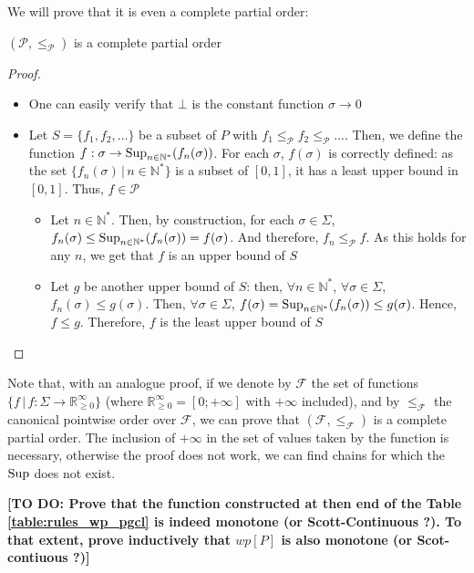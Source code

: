 \documentclass[a4paper,10pt]{llncs}
\def\NN {{\mathbb N}}
\def\RRposi {{\mathbb R_{\geq 0}^{\infty}}}
\def\Sup {\textnormal {Sup}}
\newcommand\todo[1]{{\color{red}\textbf{[TO DO:  #1]}}}
\begin{document}
We will prove that it is even a complete partial order:
\begin{theorem}
$(\mathcal{P},\leq_{\mathcal{P}})$ is a complete partial order
\end{theorem}
\begin{proof}
\begin{itemize}
\item One can easily verify that $\bot$ is the constant function $\sigma \rightarrow 0$
\item Let $S = \{f_1, f_2, \dots \}$ be a subset of $P$ with $f_1 \leq_{\mathcal{P}} f_2 \leq_{\mathcal{P}} \dots$. Then, we define the function $f : \sigma \rightarrow \Sup_{n \in \NN^*}(f_n(\sigma))$. \newline
For each $\sigma$, $f(\sigma)$ is correctly defined: as the set $\{f_n(\sigma) \,|\, n \in \NN^*\}$ is a  subset of $[0,1]$, it has a least upper bound in $[0,1]$. Thus, $f \in \mathcal{P}$
\begin{itemize}
\item Let $n \in \NN^*$. Then, by construction, for each $\sigma \in \Sigma$, $f_n(\sigma) \leq \Sup_{n \in \NN^*}(f_n(\sigma)) = f(\sigma)$. And therefore, $f_n \leq_{\mathcal{P}} f$. As this holds for any $n$, we get that $f$ is an upper bound of $S$
\item Let $g$ be another upper bound of $S$: then, $\forall n \in \NN^*$, $\forall \sigma \in \Sigma$, $f_n(\sigma) \leq g(\sigma)$. Then, $\forall \sigma \in \Sigma$, $f(\sigma) = \Sup_{n \in \NN^*}(f_n(\sigma)) \leq g(\sigma)$. Hence, $f \leq g$. Therefore, $f$ is the least upper bound of $S$
\end{itemize}
\end{itemize}
\end{proof}
 
 Note that, with an analogue proof, if we denote by $\mathcal{F}$ the set of functions $\{f \,|\, f : \Sigma \rightarrow \RRposi\}$ (where $\RRposi = [0;+\infty]$ with $+\infty$ included), and by $\leq_{\mathcal{F}}$ the canonical pointwise order over $\mathcal{F}$, we can prove that $(\mathcal{F},\leq_{\mathcal{F}})$ is a complete partial order. The inclusion of $+\infty$ in the set of values taken by the function is necessary, otherwise the proof does not work, we can find chains for which the $\Sup$ does not exist.
 
\todo{Prove that the function constructed at then end of the Table \ref{table:rules_wp_pgcl} is indeed monotone (or Scott-Continuous ?). To that extent, prove inductively that $wp[P]$ is also monotone (or Scot-contiuous ?)}
\end{document}
